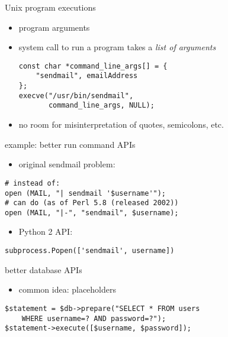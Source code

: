 \begin{frame}[fragile,label=UnixProgExec]{Unix program executions}
    \begin{itemize}
        \item program arguments 
    \item system call to run a program takes a \textit{list of arguments}
\begin{verbatim}
const char *command_line_args[] = {
    "sendmail", emailAddress
};
execve("/usr/bin/sendmail",
       command_line_args, NULL);
\end{verbatim}
    \item no room for misinterpretation of quotes, semicolons, etc.
    \end{itemize}
\end{frame}

\begin{frame}[fragile,label=processAPIs]{example: better run command APIs}
    \begin{itemize}
    \item original sendmail problem:
    \end{itemize}
\begin{verbatim}
# instead of:
open (MAIL, "| sendmail '$username'");
# can do (as of Perl 5.8 (released 2002))
open (MAIL, "|-", "sendmail", $username);
\end{verbatim}
    \begin{itemize}
    \item Python 2 API:
    \end{itemize}
\begin{verbatim}
subprocess.Popen(['sendmail', username])
\end{verbatim}
\end{frame}


\begin{frame}[fragile,label=betterDBAPI]{better database APIs}
    \begin{itemize}
        \item common idea: placeholders
    \end{itemize}
\begin{verbatim}
$statement = $db->prepare("SELECT * FROM users
    WHERE username=? AND password=?");
$statement->execute([$username, $password]);
\end{verbatim}
\end{frame}

